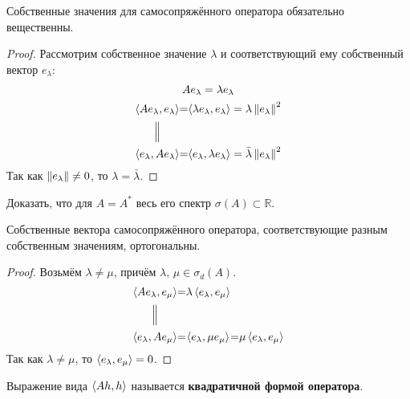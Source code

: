 \documentclass[12pt]{article}
\begin{document}
			\begin{state} \label{st:realeigenvalues}
				Собственные значения для самосопряжённого оператора обязательно вещественны.
			\end{state}
			\begin{proof}
				Рассмотрим собственное значение $\lambda$ и соответствующий ему собственный вектор $e_{\lambda}$:
				\begin{gather*}
					Ae_{\lambda} = \lambda e_{\lambda} \\
					\begin{CD}
						\scal{Ae_{\lambda}}{e_{\lambda}} @.=@. \scal{\lambda e_{\lambda}}{e_{\lambda}} = \lambda \norm{e_{\lambda}}^2 \\
						@| \\
						\scal{e_{\lambda}}{Ae_{\lambda}} @.=@. \scal{e_{\lambda}}{\lambda e_{\lambda}} = \bar{\lambda} \norm{e_{\lambda}}^2 
					\end{CD}
				\end{gather*}
				Так как $\left\| e_{\lambda} \right\| \neq 0$, то $\lambda = \bar{\lambda}$.
			\end{proof}
			\exc Доказать, что для $A = A^{*}$ весь его спектр $\sigma(A) \subset \mathbb{R}$.
	
			\begin{note}
				Собственные вектора самосопряжённого оператора, соответствующие разным собственным значениям, ортогональны.
			\end{note}
			\begin{proof} %
				Возьмём $\lambda \neq \mu$, причём $\lambda,\, \mu \in \sigma_d(A)$.
				$$
					\begin{CD}
						\scal{Ae_{\lambda}}{e_{\mu}} @.=@. \lambda\scal{e_{\lambda}}{e_{\mu}} \\
						@| \\
						\scal{e_{\lambda}}{Ae_{\mu}} @.=@. \scal{e_{\lambda}}{\mu e_{\mu}} @.=@. \mu\scal{e_{\lambda}}{e_{\mu}}
					\end{CD}
				$$
				Так как $\lambda \neq \mu$, то $\left\langle e_{\lambda}, e_{\mu} \right\rangle = 0$.
			\end{proof}
	

		\begin{defi}
			Выражение вида $\left\langle Ah, h \right\rangle$ называется \textbf{квадратичной формой оператора}.
		\end{defi}
	
\end{document}
